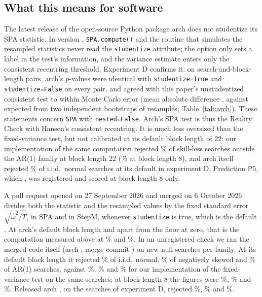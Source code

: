 \subsection{What this means for software}
\label{sec:software}
The latest release of the open-source Python package arch \citep{sheppard2025arch} does not studentize its SPA statistic. In version , \texttt{SPA.compute()} and the routine that simulates the resampled statistics never read the \texttt{studentize} attribute; the option only sets a label in the test's information, and the variance estimate enters only the consistent recentring threshold. Experiment D confirms it: on  search-and-block-length pairs, arch's $p$-values were identical with \texttt{studentize=True} and \texttt{studentize=False} on every pair, and agreed with this paper's unstudentized consistent test to within Monte Carlo error (mean absolute difference , against  expected from two independent bootstraps of  resamples; Table~\ref{tab:arch}). These statements concern \texttt{SPA} with \texttt{nested=False}. Arch's SPA test is thus the Reality Check with Hansen's consistent recentring. It is much less oversized than the fixed-variance test, but not calibrated at its default block length of 22: our implementation of the same computation rejected \% of skill-less searches outside the AR(1) family at block length 22 (\% at block length 8), and arch itself rejected \% of i.i.d.\ normal searches at its default in experiment D. Prediction P5, which , was registered and scored at block length 8 only.

A pull request opened on 27 September 2026 and merged on 6 October 2026 divides both the statistic and the resampled values by the fixed standard error $\sqrt{\hat\omega^2/T}$, in SPA and in StepM, whenever \texttt{studentize} is true, which is the default \citep{arch871}. At arch's default block length and apart from the floor at zero, that is the computation measured above at \% and \%. In an unregistered check we ran the merged code itself (arch , merge commit ) on  new null searches per family. At its default block length it rejected \% of i.i.d.\ normal, \% of negatively skewed and \% of AR(1) searches, against \%, \% and \% for our implementation of the fixed-variance test on the same searches; at block length 8 the figures were \%, \% and \%. Released arch , on the searches of experiment D, rejected \%, \% and \%.

